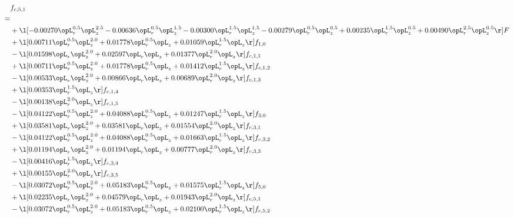 \begin{alignat}{2} 
\label{eq:f_51_1} 
& f_{c,5,1} \nonumber \\ 
 = \\ 
& + \l[  -0.00270 \opL_r^{0.5} \opL_z^{2.5}   -0.00636 \opL_r^{0.5} \opL_z^{1.5}   -0.00300 \opL_r^{1.5} \opL_z^{1.5}   -0.00279 \opL_r^{0.5} \opL_z^{0.5} +  0.00235 \opL_r^{1.5} \opL_z^{0.5} +  0.00490 \opL_r^{2.5} \opL_z^{0.5}  \r] F \nonumber \\ 
& + \l[  0.00711 \opL_r^{0.5} \opL_z^{2.0} +  0.01778 \opL_r^{0.5} \opL_z +  0.01059 \opL_r^{1.5} \opL_z  \r] f_{1,0} \nonumber \\ 
& - \l[  0.01598 \opL_r \opL_z^{2.0} +  0.02597 \opL_r \opL_z +  0.01377 \opL_r^{2.0} \opL_z  \r] f_{c,1,1} \nonumber \\ 
& + \l[  0.00711 \opL_r^{0.5} \opL_z^{2.0} +  0.01778 \opL_r^{0.5} \opL_z +  0.01412 \opL_r^{1.5} \opL_z  \r] f_{c,1,2} \nonumber \\ 
& - \l[  0.00533 \opL_r \opL_z^{2.0} +  0.00866 \opL_r \opL_z +  0.00689 \opL_r^{2.0} \opL_z  \r] f_{c,1,3} \nonumber \\ 
& + \l[  0.00353 \opL_r^{1.5} \opL_z  \r] f_{c,1,4} \nonumber \\ 
& - \l[  0.00138 \opL_r^{2.0} \opL_z  \r] f_{c,1,5} \nonumber \\ 
& - \l[  0.04122 \opL_r^{0.5} \opL_z^{2.0} +  0.04088 \opL_r^{0.5} \opL_z +  0.01247 \opL_r^{1.5} \opL_z  \r] f_{3,0} \nonumber \\ 
& + \l[  0.03581 \opL_r \opL_z^{2.0} +  0.03581 \opL_r \opL_z +  0.01554 \opL_r^{2.0} \opL_z  \r] f_{c,3,1} \nonumber \\ 
& - \l[  0.04122 \opL_r^{0.5} \opL_z^{2.0} +  0.04088 \opL_r^{0.5} \opL_z +  0.01663 \opL_r^{1.5} \opL_z  \r] f_{c,3,2} \nonumber \\ 
& + \l[  0.01194 \opL_r \opL_z^{2.0} +  0.01194 \opL_r \opL_z +  0.00777 \opL_r^{2.0} \opL_z  \r] f_{c,3,3} \nonumber \\ 
& - \l[  0.00416 \opL_r^{1.5} \opL_z  \r] f_{c,3,4} \nonumber \\ 
& + \l[  0.00155 \opL_r^{2.0} \opL_z  \r] f_{c,3,5} \nonumber \\ 
& - \l[  0.03072 \opL_r^{0.5} \opL_z^{2.0} +  0.05183 \opL_r^{0.5} \opL_z +  0.01575 \opL_r^{1.5} \opL_z  \r] f_{5,0} \nonumber \\ 
& + \l[  0.02235 \opL_r \opL_z^{2.0} +  0.04579 \opL_r \opL_z +  0.01943 \opL_r^{2.0} \opL_z  \r] f_{c,5,1} \nonumber \\ 
& - \l[  0.03072 \opL_r^{0.5} \opL_z^{2.0} +  0.05183 \opL_r^{0.5} \opL_z +  0.02100 \opL_r^{1.5} \opL_z  \r] f_{c,5,2} \nonumber \\ 

\end{alignat}
